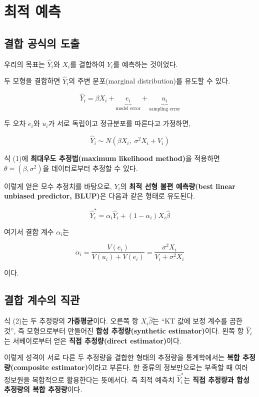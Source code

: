 \documentclass[
  letterpaper,
  DIV=11,
  numbers=noendperiod]{scrreprt}
\begin{document}
\section{최적 예측}\label{uxcd5cuxc801-uxc608uxce21}

\subsection{결합 공식의
도출}\label{uxacb0uxd569-uxacf5uxc2dduxc758-uxb3c4uxcd9c}

우리의 목표는 \(\hat{Y}_i\)와 \(X_i\)를 결합하여 \(Y_i\)를 예측하는
것이었다.

두 모형을 결합하면 \(\hat{Y}_i\)의 주변 분포(marginal distribution)를
유도할 수 있다.

\[\hat{Y}_i = \beta X_i + \underbrace{e_i}_{\text{model error}} + \underbrace{u_i}_{\text{sampling error}}\]

두 오차 \(e_i\)와 \(u_i\)가 서로 독립이고 정규분포를 따른다고 가정하면,

\[\hat{Y}_i \sim N\left(\beta X_i,\; \sigma^2 X_i + V_i\right) \tag{1}\]

식 (1)에 \textbf{최대우도 추정법(maximum likelihood method)}을 적용하면
\(\theta = (\beta, \sigma^2)\)을 데이터로부터 추정할 수 있다.

이렇게 얻은 모수 추정치를 바탕으로, \(Y_i\)의 \textbf{최적 선형 불편
예측량(best linear unbiased predictor, BLUP)}은 다음과 같은 형태로
유도된다.

\[\hat{Y}_i^* = \alpha_i \hat{Y}_i + (1 - \alpha_i) X_i \hat{\beta} \tag{2}\]

여기서 결합 계수 \(\alpha_i\)는

\[\alpha_i = \frac{V(e_i)}{V(u_i) + V(e_i)} = \frac{\sigma^2 X_i}{V_i + \sigma^2 X_i}\]

이다.

\subsection{결합 계수의
직관}\label{uxacb0uxd569-uxacc4uxc218uxc758-uxc9c1uxad00}

식 (2)는 두 추정량의 \textbf{가중평균}이다. 오른쪽 항
\(X_i \hat{\beta}\)는 ``KT 값에 보정 계수를 곱한 것'', 즉 모형으로부터
만들어진 \textbf{합성 추정량(synthetic estimator)}이다. 왼쪽 항
\(\hat{Y}_i\)는 서베이로부터 얻은 \textbf{직접 추정량(direct
estimator)}이다.

이렇게 성격이 서로 다른 두 추정량을 결합한 형태의 추정량을 통계학에서는
\textbf{복합 추정량(composite estimator)}이라고 부른다. 한 종류의
정보만으로는 부족할 때 여러 정보원을 복합적으로 활용한다는 뜻에서다. 즉
최적 예측치 \(\hat{Y}_i^*\)는 \textbf{직접 추정량과 합성 추정량의 복합
추정량}이다.
\end{document}
